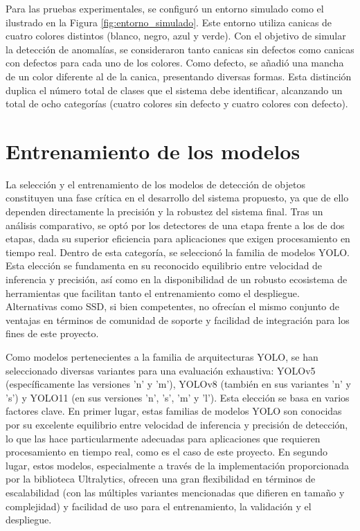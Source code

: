 \documentclass[11pt,spanish,listoffigures,listoftables]{tfgetsinf}
\begin{document}
Para las pruebas experimentales, se configuró un entorno simulado como el ilustrado en la Figura \ref{fig:entorno_simulado}. Este entorno utiliza canicas de cuatro colores distintos (blanco, negro, azul y verde). Con el objetivo de simular la detección de anomalías, se consideraron tanto canicas sin defectos como canicas con defectos para cada uno de los colores. Como defecto, se añadió una mancha de un color diferente al de la canica, presentando diversas formas. Esta distinción duplica el número total de clases que el sistema debe identificar, alcanzando un total de ocho categorías (cuatro colores sin defecto y cuatro colores con defecto).


\section{Entrenamiento de los modelos} \label{sec:entrenamiento_modelo}

La selección y el entrenamiento de los modelos de detección de objetos constituyen una fase crítica en el desarrollo del sistema propuesto, ya que de ello dependen directamente la precisión y la robustez del sistema final.
Tras un análisis comparativo, se optó por los detectores de una etapa frente a los de dos etapas, dada su superior eficiencia para aplicaciones que exigen procesamiento en tiempo real. Dentro de esta categoría, se seleccionó la familia de modelos YOLO. Esta elección se fundamenta en su reconocido equilibrio entre velocidad de inferencia y precisión, así como en la disponibilidad de un robusto ecosistema de herramientas que facilitan tanto el entrenamiento como el despliegue. Alternativas como SSD, si bien competentes, no ofrecían el mismo conjunto de ventajas en términos de comunidad de soporte y facilidad de integración para los fines de este proyecto.

Como modelos pertenecientes a la familia de arquitecturas YOLO, se han seleccionado diversas variantes para una evaluación exhaustiva: YOLOv5 (específicamente las versiones 'n' y 'm'), YOLOv8 (también en sus variantes 'n' y 's') y YOLO11 (en sus versiones 'n', 's', 'm' y 'l'). Esta elección se basa en varios factores clave. En primer lugar, estas familias de modelos YOLO son conocidas por su excelente equilibrio entre velocidad de inferencia y precisión de detección, lo que las hace particularmente adecuadas para aplicaciones que requieren procesamiento en tiempo real, como es el caso de este proyecto. En segundo lugar, estos modelos, especialmente a través de la implementación proporcionada por la biblioteca Ultralytics, ofrecen una gran flexibilidad en términos de escalabilidad (con las múltiples variantes mencionadas que difieren en tamaño y complejidad) y facilidad de uso para el entrenamiento, la validación y el despliegue.
\end{document}
